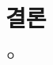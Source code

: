 \documentclass[a4paper, 10pt, nanum]{CSUniSchoolLabReport}
\begin{document}
\section{결론}

	ㅇ



\end{document}
